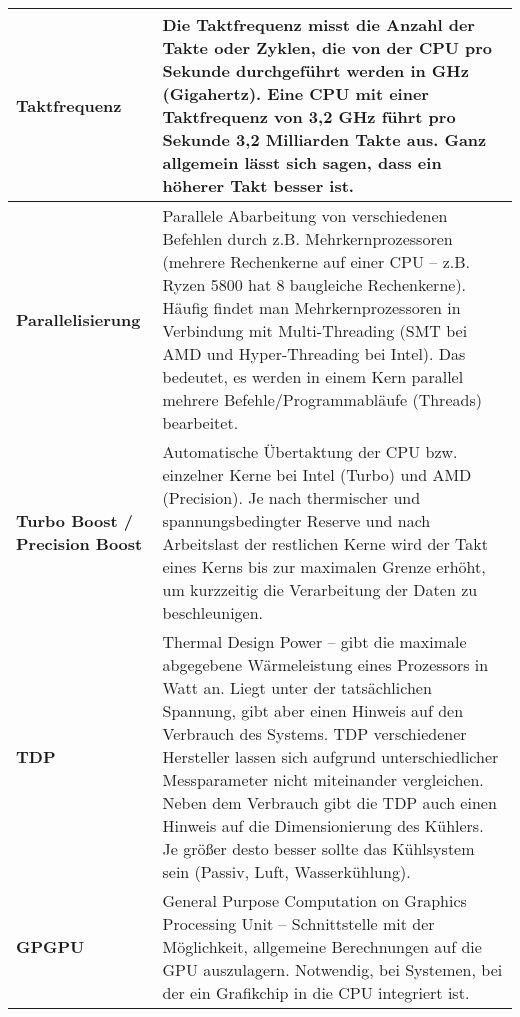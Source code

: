 \documentclass[asp1.tex]{subfiles}
\begin{document}
\begin{longtable}{|p{}|p{}|}
    \\\hline

    \textbf{Taktfrequenz}                  & Die Taktfrequenz misst die Anzahl der Takte oder Zyklen, die von der CPU pro Sekunde durchgeführt werden in GHz (Gigahertz). Eine CPU mit einer Taktfrequenz von 3,2 GHz führt pro Sekunde 3,2 Milliarden Takte aus. Ganz allgemein lässt sich sagen, dass ein höherer Takt besser ist.

    \\\hline

    \textbf{Parallelisierung}              & Parallele Abarbeitung von verschiedenen Befehlen durch z.B. Mehrkernprozessoren (mehrere Rechenkerne auf einer CPU – z.B. Ryzen 5800 hat 8 baugleiche Rechenkerne). Häufig findet man Mehrkernprozessoren in Verbindung mit Multi-Threading (SMT bei AMD und Hyper-Threading bei Intel). Das bedeutet, es werden in einem Kern parallel mehrere Befehle/Programmabläufe (Threads) bearbeitet.

    \\\hline

    \textbf{Turbo Boost / Precision Boost} & Automatische Übertaktung der CPU bzw. einzelner Kerne bei Intel (Turbo) und AMD (Precision). Je nach thermischer und spannungsbedingter Reserve und nach Arbeitslast der restlichen Kerne wird der Takt eines Kerns bis zur maximalen Grenze erhöht, um kurzzeitig die Verarbeitung der Daten zu beschleunigen.

    \\\hline

    \textbf{TDP}                           & Thermal Design Power – gibt die maximale abgegebene Wärmeleistung eines Prozessors in Watt an. Liegt unter der tatsächlichen Spannung, gibt aber einen Hinweis auf den Verbrauch des Systems. TDP verschiedener Hersteller lassen sich aufgrund unterschiedlicher Messparameter nicht miteinander vergleichen. Neben dem Verbrauch gibt die TDP auch einen Hinweis auf die Dimensionierung des Kühlers. Je größer desto besser sollte das Kühlsystem sein (Passiv, Luft, Wasserkühlung).

    \\\hline

    \textbf{GPGPU}                         & General Purpose Computation on Graphics Processing Unit – Schnittstelle mit der Möglichkeit, allgemeine Berechnungen auf die GPU auszulagern. Notwendig, bei Systemen, bei der ein Grafikchip in die CPU integriert ist.

    \\\hline
\end{longtable}
\end{document}
